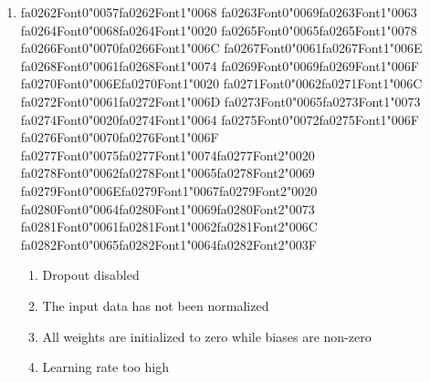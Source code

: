 \documentclass[12pt]{article}
\begin{document}
\begin{enumerate}[label=Q\arabic*.]
 \begin{enumerate}[label=(\Alph*)]
     \item Cross-entropy loss misconfigured
     \item The final layer is using Softmax without temperature scaling
     \item Learning rate too high
     \item All pre-activation values are negative in the first layer
 \end{enumerate}
 
 \item {\csname fa0262Font0\endcsname\char"0057}{\csname fa0262Font1\endcsname\char"0068} {\csname fa0263Font0\endcsname\char"0069}{\csname fa0263Font1\endcsname\char"0063} {\csname fa0264Font0\endcsname\char"0068}{\csname fa0264Font1\endcsname\char"0020} {\csname fa0265Font0\endcsname\char"0065}{\csname fa0265Font1\endcsname\char"0078} {\csname fa0266Font0\endcsname\char"0070}{\csname fa0266Font1\endcsname\char"006C} {\csname fa0267Font0\endcsname\char"0061}{\csname fa0267Font1\endcsname\char"006E} {\csname fa0268Font0\endcsname\char"0061}{\csname fa0268Font1\endcsname\char"0074} {\csname fa0269Font0\endcsname\char"0069}{\csname fa0269Font1\endcsname\char"006F} {\csname fa0270Font0\endcsname\char"006E}{\csname fa0270Font1\endcsname\char"0020} {\csname fa0271Font0\endcsname\char"0062}{\csname fa0271Font1\endcsname\char"006C} {\csname fa0272Font0\endcsname\char"0061}{\csname fa0272Font1\endcsname\char"006D} {\csname fa0273Font0\endcsname\char"0065}{\csname fa0273Font1\endcsname\char"0073} {\csname fa0274Font0\endcsname\char"0020}{\csname fa0274Font1\endcsname\char"0064} {\csname fa0275Font0\endcsname\char"0072}{\csname fa0275Font1\endcsname\char"006F} {\csname fa0276Font0\endcsname\char"0070}{\csname fa0276Font1\endcsname\char"006F} {\csname fa0277Font0\endcsname\char"0075}{\csname fa0277Font1\endcsname\char"0074}{\csname fa0277Font2\endcsname\char"0020} {\csname fa0278Font0\endcsname\char"0062}{\csname fa0278Font1\endcsname\char"0065}{\csname fa0278Font2\endcsname\char"0069} {\csname fa0279Font0\endcsname\char"006E}{\csname fa0279Font1\endcsname\char"0067}{\csname fa0279Font2\endcsname\char"0020} {\csname fa0280Font0\endcsname\char"0064}{\csname fa0280Font1\endcsname\char"0069}{\csname fa0280Font2\endcsname\char"0073} {\csname fa0281Font0\endcsname\char"0061}{\csname fa0281Font1\endcsname\char"0062}{\csname fa0281Font2\endcsname\char"006C} {\csname fa0282Font0\endcsname\char"0065}{\csname fa0282Font1\endcsname\char"0064}{\csname fa0282Font2\endcsname\char"003F}
 \begin{enumerate}[label=(\Alph*)]
     \item Dropout disabled
     \item The input data has not been normalized
     \item All weights are initialized to zero while biases are non-zero
     \item Learning rate too high
 \end{enumerate}
 

\end{enumerate}
\end{document}

